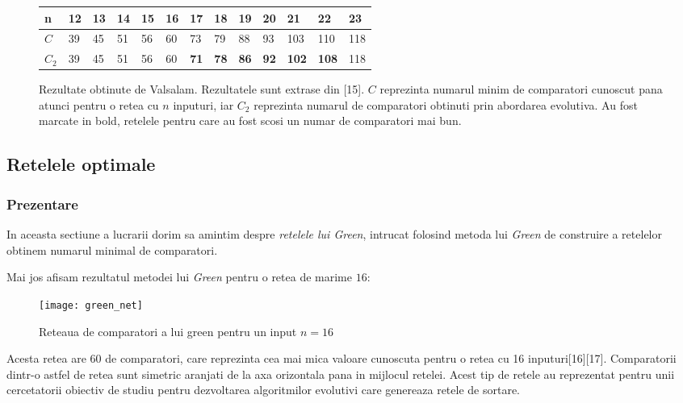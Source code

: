 \documentclass[12pt]{article}
\begin{document}
\begin{figure}
\centering
\begin{tabu} to 1.19	 \textwidth {  X[0] | X[1]  |  X[2]  |  X[3] | X[4] | X[5] | X[6] | X[7] | X[8] | X[9] | X[10] | X[11] | X[12] }
 \hline
 n & 12 & 13 & 14 & 15 & 16 & 17 & 18 & 19 & 20 & 21 & 22 & 23\\
 \hline
 $C$  & 39 & 45 & 51 & 56 & 60 & 73 & 79 & 88 & 93 & 103 & 110 & 118\\
 \hline
 $C_2$ & 39 & 45 & 51 & 56 & 60 & \textbf{71} & \textbf{78} & \textbf{86} & \textbf{92} & \textbf{102} & \textbf{108} & 118 \\
 
\hline
\end{tabu}
\caption{Rezultate obtinute de Valsalam. Rezultatele sunt extrase din [15]. $C$ reprezinta numarul minim de comparatori cunoscut pana atunci pentru o retea cu $n$ inputuri, iar $C_2$ reprezinta numarul de comparatori obtinuti prin abordarea evolutiva. Au fost marcate in bold, retelele pentru care au fost scosi un numar de comparatori mai bun.}
\end{figure}


\subsection{Retelele optimale}

\subsubsection{Prezentare}
In aceasta sectiune a lucrarii dorim sa amintim despre \textit{retelele lui Green}, intrucat folosind metoda lui \textit{Green} de construire a retelelor obtinem numarul minimal de comparatori.

Mai jos afisam rezultatul metodei lui \textit{Green} pentru o retea de marime $16$:

\begin{figure}
\centering
\texttt{[image: green\_net]}
\\
\caption{Reteaua de comparatori a lui green pentru un input $n = 16$}
\end{figure}

Acesta retea are $60$ de comparatori, care reprezinta cea mai mica valoare cunoscuta pentru o retea cu 16 inputuri[16][17]. Comparatorii dintr-o astfel de retea sunt simetric aranjati de la axa orizontala pana in mijlocul retelei. Acest tip de retele au reprezentat pentru unii cercetatorii obiectiv de studiu pentru dezvoltarea algoritmilor evolutivi care genereaza retele de sortare. 
\end{document}
